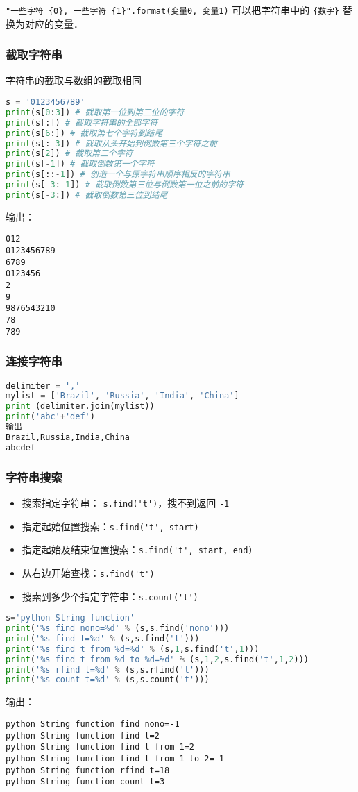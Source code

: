 \verb|"一些字符 {0}, 一些字符 {1}".format(变量0, 变量1)| 可以把字符串中的 \verb|{数字}| 替换为对应的变量．

\subsubsection{截取字符串}
字符串的截取与数组的截取相同
\begin{lstlisting}[language=python]
s = '0123456789'
print(s[0:3]) # 截取第一位到第三位的字符
print(s[:]) # 截取字符串的全部字符
print(s[6:]) # 截取第七个字符到结尾
print(s[:-3]) # 截取从头开始到倒数第三个字符之前
print(s[2]) # 截取第三个字符
print(s[-1]) # 截取倒数第一个字符
print(s[::-1]) # 创造一个与原字符串顺序相反的字符串
print(s[-3:-1]) # 截取倒数第三位与倒数第一位之前的字符
print(s[-3:]) # 截取倒数第三位到结尾
\end{lstlisting}
输出：
\begin{lstlisting}
012
0123456789
6789
0123456
2
9
9876543210
78
789
\end{lstlisting}

\subsubsection{连接字符串}
\begin{lstlisting}[language=python]
delimiter = ','
mylist = ['Brazil', 'Russia', 'India', 'China']
print (delimiter.join(mylist))
print('abc'+'def')
输出
Brazil,Russia,India,China
abcdef
\end{lstlisting}

\subsubsection{字符串搜索}
\begin{itemize}
\item 搜索指定字符串： \verb|s.find('t')|，搜不到返回 \verb|-1|
\item 指定起始位置搜索：\verb|s.find('t', start)|
\item 指定起始及结束位置搜索：\verb|s.find('t', start, end)|
\item 从右边开始查找：\verb|s.find('t')|
\item 搜索到多少个指定字符串：\verb|s.count('t')|
\end{itemize}

\begin{lstlisting}[language=python]
s='python String function'
print('%s find nono=%d' % (s,s.find('nono')))
print('%s find t=%d' % (s,s.find('t')))
print('%s find t from %d=%d' % (s,1,s.find('t',1)))
print('%s find t from %d to %d=%d' % (s,1,2,s.find('t',1,2)))
print('%s rfind t=%d' % (s,s.rfind('t')))
print('%s count t=%d' % (s,s.count('t')))
\end{lstlisting}
输出：
\begin{lstlisting}
python String function find nono=-1
python String function find t=2
python String function find t from 1=2
python String function find t from 1 to 2=-1
python String function rfind t=18
python String function count t=3
\end{lstlisting}

